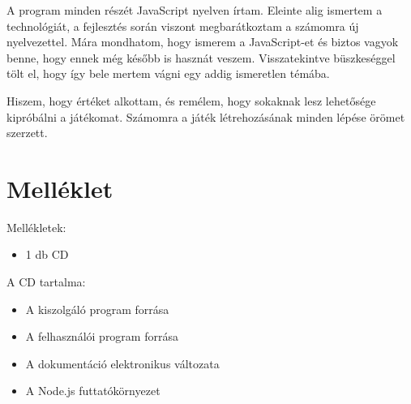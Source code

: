 \documentclass[bibliography=totocnumbered]{article}
\begin{document}
A program minden részét JavaScript nyelven írtam. Eleinte alig ismertem
a technológiát, a fejlesztés során viszont megbarátkoztam a számomra új
nyelvezettel. Mára mondhatom, hogy ismerem a JavaScript-et és biztos
vagyok benne, hogy ennek még később is hasznát veszem. Visszatekintve
büszkeséggel tölt el, hogy így bele mertem vágni egy addig ismeretlen
témába.

Hiszem, hogy értéket alkottam, és remélem, hogy sokaknak lesz lehetősége
kipróbálni a játékomat. Számomra a játék létrehozásának minden lépése
örömet szerzett.


\nocite{*}

\let\oldsection\section
\let\Section\section 
\def\section*#1{\Section{#1}} 


\renewcommand{\section}[1]{\oldsection{#1}}

\section{Melléklet}

Mellékletek:

\begin{itemize}
\item
  1 db CD
\end{itemize}

A CD tartalma:

\begin{itemize}
\item
  A kiszolgáló program forrása
\item
  A felhasználói program forrása
\item
  A dokumentáció elektronikus változata
\item
  A Node.js futtatókörnyezet
\end{itemize}
\end{document}
